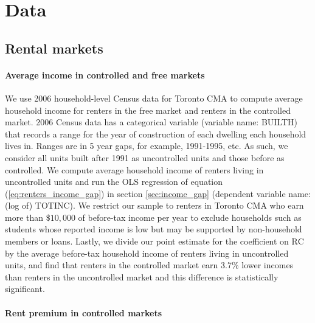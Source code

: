 \documentclass[parskip=full]{article}
\begin{document}
\section{Data}\label{appendix:data}

\subsection{Rental markets}

\paragraph{Average income in controlled and free markets}
We use 2006 household-level Census data for Toronto CMA to compute average household income for renters in the free market and renters in the controlled market. 2006 Census data has a categorical variable (variable name: BUILTH) that records a range for the year of construction of each dwelling each household lives in. Ranges are in 5 year gaps, for example, 1991-1995, etc. As such, we consider all units built after 1991 as uncontrolled units and those before as controlled. We compute average household income of renters living in uncontrolled units and run the OLS regression of equation (\ref{eq:renters_income_gap}) in section \ref{sec:income_gap} (dependent variable name: (log of) TOTINC). We restrict our sample to renters in Toronto CMA who earn more than $\$10,000$ of before-tax income per year to exclude households such as students whose reported income is low but may be supported by non-household members or loans. Lastly, we divide our point estimate for the coefficient on $\mbox{RC}$ by the average before-tax household income of renters living in uncontrolled units, and find that renters in the controlled market earn 3.7\% lower incomes than renters in the uncontrolled market and this difference is statistically significant.

\paragraph{Rent premium in controlled markets}
\end{document}
